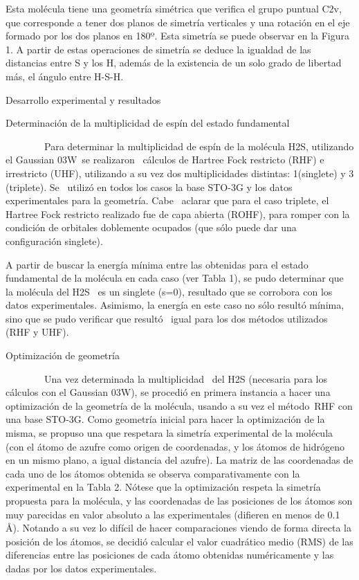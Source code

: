 \documentclass[]{article}
\begin{document}
{Esta molécula tiene una geometría simétrica que verifica el grupo
puntual C}{2v}{, que corresponde a tener dos planos de simetría
verticales y una rotación en el eje formado por los dos planos en 180º.
Esta simetría se puede observar en la Figura 1. A partir de estas
operaciones de simetría se deduce la igualdad de las distancias entre S
y los H, además de la existencia de un solo grado de libertad más, el
ángulo entre H-S-H.}

{}

{Desarrollo experimental y resultados}

{}

{Determinación de la multiplicidad de espín del estado fundamental}

{~~~~~~~~Para determinar la multiplicidad de espín de la molécula
H}{2}{S, utilizando el }{Gaussian }{03W}{~}{se realizaron ~cálculos de
Hartree Fock restricto (RHF) e irrestricto (UHF), utilizando a su vez
dos multiplicidades distintas: 1(singlete) y 3 (triplete). Se ~utilizó
en todos los casos la base STO-3G y los datos experimentales para la
geometría. Cabe ~aclarar que para el caso triplete, el Hartree Fock
restricto realizado fue de capa abierta (ROHF), para romper con la
condición de orbitales doblemente ocupados (que sólo puede dar una
configuración singlete).}

{A partir de buscar la energía mínima entre las obtenidas para el estado
fundamental de la molécula en cada caso (ver Tabla 1), se pudo
determinar que la molécula del H}{2}{S ~es un singlete (s=0), resultado
que se corrobora con los datos experimentales. Asimismo, la energía en
este caso no sólo resultó mínima, sino que se pudo verificar que resultó
~igual para los dos métodos utilizados (RHF y UHF).}

{}

{Optimización de geometría}

{~~~~~~~~Una vez determinada la multiplic}{idad ~del H}{2}{S (necesaria
para los cálculos con el }{Gaussian 03W}{), se procedió en primera
instancia a hacer una optimización de la geometría de la molécula,
usando a su vez el método}{~}{RHF con una base STO-3G. Como geometría
inicial para hacer la optimización de la misma, se propuso una que
respetara la simetría experimental de la molécula (con el átomo de
azufre como origen de coordenadas, y los átomos de hidrógeno }{en un
mismo plano, a igual distancia del azufre}{). La matriz de las
coordenadas de cada uno de los átomos obtenida se observa
comparativamente con la experimental en la Tabla 2. Nótese que la
optimización respeta la simetría propuesta para la molécula, y las
coordenadas de las posiciones de los átomos son muy parecidas en valor
absoluto a las experimentales (difieren en menos de 0.1 Å). Notando a su
vez lo difícil de hacer comparaciones viendo de forma directa la
posición de los átomos, se decidió calcular el valor cuadrático medio
(RMS) de las diferencias entre las posiciones de cada átomo obtenidas
numéricamente y las dadas por los datos experimentales. }
\end{document}
